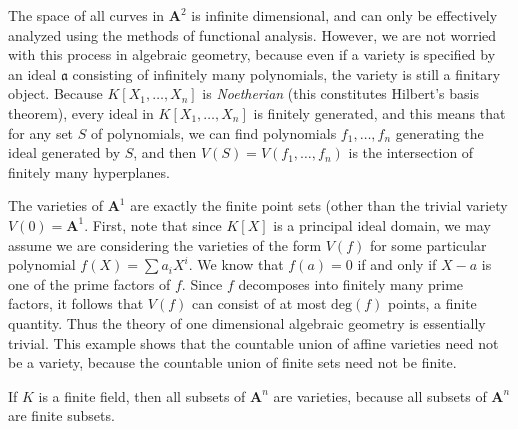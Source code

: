 The space of all curves in $\mathbf{A}^2$ is infinite dimensional, and can only be effectively analyzed using the methods of functional analysis. However, we are not worried with this process in algebraic geometry, because even if a variety is specified by an ideal $\mathfrak{a}$ consisting of infinitely many polynomials, the variety is still a finitary object. Because $K[X_1, \dots, X_n]$ is {\it Noetherian} (this constitutes Hilbert's basis theorem), every ideal in $K[X_1, \dots, X_n]$ is finitely generated, and this means that for any set $S$ of polynomials, we can find polynomials $f_1, \dots, f_n$ generating the ideal generated by $S$, and then $V(S) = V(f_1, \dots, f_n)$ is the intersection of finitely many hyperplanes.

\begin{example}
    The varieties of $\mathbf{A}^1$ are exactly the finite point sets (other than the trivial variety $V(0) = \mathbf{A}^1$. First, note that since $K[X]$ is a principal ideal domain, we may assume we are considering the varieties of the form $V(f)$ for some particular polynomial $f(X) = \sum a_i X^i$. We know that $f(a) = 0$ if and only if $X - a$ is one of the prime factors of $f$. Since $f$ decomposes into finitely many prime factors, it follows that $V(f)$ can consist of at most $\text{deg}(f)$ points, a finite quantity. Thus the theory of one dimensional algebraic geometry is essentially trivial. This example shows that the countable union of affine varieties need not be a variety, because the countable union of finite sets need not be finite.
\end{example}

\begin{example}
    If $K$ is a finite field, then all subsets of $\mathbf{A}^n$ are varieties, because all subsets of $\mathbf{A}^n$ are finite subsets.
\end{example}

